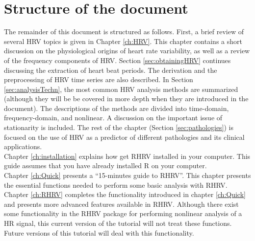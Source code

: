 \section{Structure of the document} The remainder of this document is structured as follows. First, a brief review of several \gls{HRV} topics is given in Chapter \ref{ch:HRV}. This chapter contains a short discussion on the physiological origins of heart rate variability, as well as a review of the frequency
components of \gls{HRV}. Section \ref{sec:obtainingHRV} continues discussing the extraction of heart beat periods. The derivation and the preprocessing of \gls{HRV} time series are also described.  In Section \ref{sec:analysisTechn}, the most common \gls{HRV} analysis methods are summarized (although they will be be covered in more depth when they are introduced in the document). The descriptions
of the methods are divided into time-domain, frequency-domain, and nonlinear. A discussion on the important issue of stationarity is included. The rest of the chapter (Section \ref{sec:pathologies}) is focused on the use of \gls{HRV} as a predictor of different pathologies and its clinical applications.\\

Chapter \ref{ch:installation} explains how get RHRV installed in your computer. This guide assumes that you have already installed R on your computer.\\

Chapter \ref{ch:Quick} presents a ``15-minutes guide to RHRV''. This chapter presents the essential functions needed to perform some basic analysis with RHRV. Chapter \ref{ch:RHRV} completes the functionality introduced in chapter \ref{ch:Quick} and presents more advanced features available in RHRV. Although there exist some functionality in the RHRV package for performing nonlinear analysis of a \gls{HR} signal, this current version of the tutorial will not treat these functions. Future versions of this tutorial will deal with this functionality.
